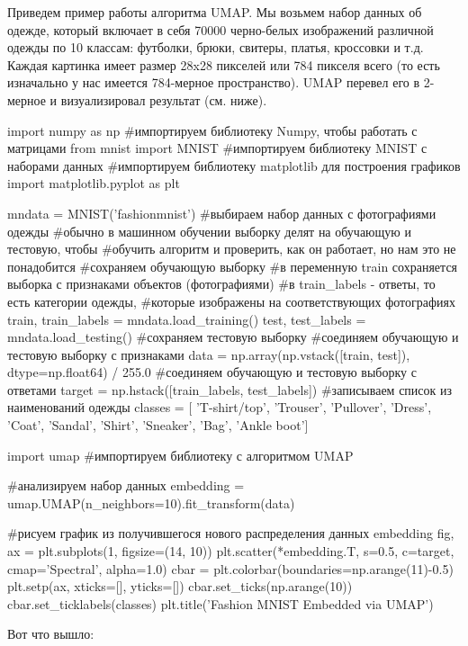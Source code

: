 \begin{itemize}
	Приведем пример работы алгоритма UMAP. Мы возьмем набор данных об одежде, который включает в себя 70000 черно-белых изображений различной одежды по 10 классам: футболки, брюки, свитеры, платья, кроссовки и т.д. Каждая картинка имеет размер 28x28 пикселей или 784 пикселя всего (то есть изначально у нас имеется 784-мерное пространство). UMAP перевел его в 2-мерное и визуализировал результат (см. ниже).
	
	\begin{listing}[1]{1}
import numpy as np #импортируем библиотеку Numpy, чтобы работать с матрицами
from mnist import MNIST #импортируем библиотеку MNIST с наборами данных
#импортируем библиотеку matplotlib для построения графиков
import matplotlib.pyplot as plt
		
mndata = MNIST('fashionmnist') #выбираем набор данных с фотографиями одежды
#обычно в машинном обучении выборку делят на обучающую и тестовую, чтобы
#обучить алгоритм и проверить, как он работает, но нам это не понадобится
#сохраняем обучающую выборку
#в переменную train сохраняется выборка с признаками объектов (фотографиями)
#в train_labels - ответы, то есть категории одежды,
#которые изображены на соответствующих фотографиях
train, train_labels = mndata.load_training() 
test, test_labels = mndata.load_testing() #сохраняем тестовую выборку
#соединяем обучающую и тестовую выборку с признаками
data = np.array(np.vstack([train, test]), dtype=np.float64) / 255.0
#соединяем обучающую и тестовую выборку с ответами
target = np.hstack([train_labels, test_labels])
#записываем список из наименований одежды
classes = [
	'T-shirt/top',
	'Trouser',
	'Pullover',
	'Dress',
	'Coat',
	'Sandal',
	'Shirt',
	'Sneaker',
	'Bag',
	'Ankle boot']
			
import umap #импортируем библиотеку с алгоритмом UMAP

#анализируем набор данных
embedding = umap.UMAP(n_neighbors=10).fit_transform(data)
		
#рисуем график из получившегося нового распределения данных embedding
fig, ax = plt.subplots(1, figsize=(14, 10))
plt.scatter(*embedding.T, s=0.5, c=target, cmap='Spectral', alpha=1.0)
cbar = plt.colorbar(boundaries=np.arange(11)-0.5)
plt.setp(ax, xticks=[], yticks=[])
cbar.set_ticks(np.arange(10))
cbar.set_ticklabels(classes)
plt.title('Fashion MNIST Embedded via UMAP')
	\end{listing}

Вот что вышло:


\end{itemize}
